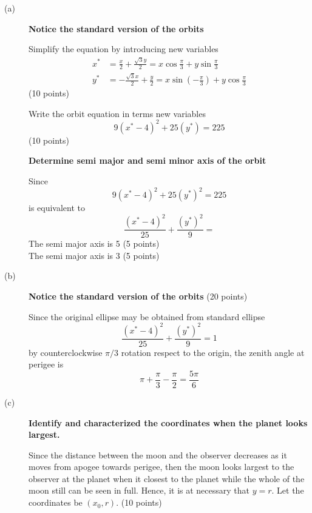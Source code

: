 \begin{description}
\item[(a)] \textbf{Notice the standard version of the orbits}

  Simplify the equation by introducing new variables
  \begin{align*}
    x^* &= \frac{x}{2} + \frac{\sqrt{3}y}{2}
      = x\cos\frac{\pi}{3} + y\sin\frac{\pi}{3} \\
    y^* &= -\frac{\sqrt{3}x}{2} + \frac{y}{2}
      = x\sin\left(-\frac{\pi}{3}\right) + y\cos\frac{\pi}{3}
  \end{align*}
  \hfill(10 points)

  Write the orbit equation in terms new variables
  \[
    9(x^* - 4)^2 + 25(y^*) = 225
  \]
  \hfill(10 points)

  \textbf{Determine semi major and semi minor axis of the orbit}

  Since
  \[
    9(x^* - 4)^2 + 25(y^*)^2 = 225
  \]
  is equivalent to
  \[
    \frac{(x^* - 4)^2}{25} + \frac{(y^*)^2}{9} =
  \]
  The semi major axis is 5 \hfill(5 points) \\
  The semi major axis is 3 \hfill(5 points) %

\item[(b)] \textbf{Notice the standard version of the orbits} \hfill(20 points)

  Since the original ellipse may be obtained from standard ellipse
  \[
    \frac{(x^* - 4)^2}{25} + \frac{(y^*)^2}{9} = 1
  \]
  by counterclockwise $\pi/3$ rotation respect to the origin, the zenith angle
  at perigee is
  \[
    \pi + \frac{\pi}{3} - \frac{\pi}{2} = \frac{5\pi}{6}
  \]

\item[(c)] \textbf{Identify and characterized the coordinates when the planet
  looks largest.} %

  Since the distance between the moon and the observer decreases as it moves
  from apogee towards perigee, then the moon looks largest to the observer at
  the planet when it closest to the planet while the whole of the moon still
  can be seen in full. Hence, it is at necessary that $y = r$. Let the %
  coordinates be $(x_0, r)$. \hfill(10 points)



\end{description}
